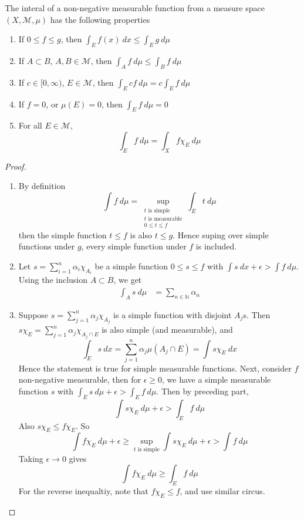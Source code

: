 \begin{theorem}
  \label{thm:properties_of_integrals}
  The interal of a non-negative measurable function from a measure space $(X, \mathcal{M}, \mu)$ has the following properties \begin{enumerate}[label=(\arabic*)]
    \item If $0 \le f \le g$, then $\int_ E f(x) \ dx \le \int_E g \ d \mu$
    \item If $A \subset B$, $A, B \in \mathcal{M}$, then $\int_A f \ d \mu \le \int_B f \ d \mu$
    \item If $c \in [0, \infty)$, $ E \in \mathcal{M}$, then $\int_E cf \ d \mu = c \int_E f \ d \mu$
    \item If $f = 0$, or $ \mu(E) = 0$, then $\int_E f \ d \mu = 0$
    \item For all $ E \in \mathcal{M}$, \[
        \int_E f \ d \mu = \int_X f \chi_{E} \ d \mu
    \]
  \end{enumerate}
\end{theorem}
\begin{proof}
  \begin{enumerate}[label=(\arabic*)]
    \item By definition \[
        \int f \ d \mu = \sup_{\substack{t \textrm{ is simple} \\ t \textrm{ is measurable} \\ 0 \le t \le f}} \int_E  t \ d \mu
    \]
      then the simple function  $t \le f$ is also $ t \le g$. Hence suping over simple functions under $g$, every simple function under $ f$ is included.
    \item Let $s = \sum_{i = 1}^{n} \alpha_i \chi_{A_i}$ be a simple function $0 \le s \le f$ with $\int s \ dx + \epsilon > \int f \ d \mu$.
      Using the inclusion $ A \subset B$, we get \begin{align*}
        \int_A s \ d \mu &= \sum_{n \in \mathbb{N}} \alpha_n
      \end{align*}

    \item Suppose $s = \sum_{j = 1}^{n} \alpha_j \chi_{A_j}$ is a simple function with disjoint $A_j$s. Then $s \chi_{E} = \sum_{j = 1}^{n} \alpha_j \chi_{A_j \cap E}$ is also simple (and measurable), and \[
        \int_E s \ dx = \sum_{j = 1}^{n} \alpha_j \mu(A_j \cap E) = \int  s \chi_{E} \ dx
    \]
      Hence the statement is true for simple measurable functions. Next, consider $f$ non-negative measurable, then for $\epsilon \ge 0$, we have a simple measurable function $s$ with $\int_E s \ d \mu + \epsilon > \int_E f \ d \mu$. Then by preceding part, \[
          \int s \chi_{E} \ d \mu + \epsilon > \int_E f \ d \mu
      \]
      Also $s \chi_E \le f \chi_E$. So \[
          \int f \chi_E \ d \mu + \epsilon \ge \sup_{t \textrm{ is simple}} \int s \chi_E \ d \mu + \epsilon > \int f \ d \mu
      \]
      Taking $\epsilon \to 0$ gives \[
          \int f \chi_E \ d \mu \ge \int_E f \ d \mu
      \]
      For the reverse inequaltiy, note that $f \chi_E \le f$, and use similar circus.
  \end{enumerate}
\end{proof}

